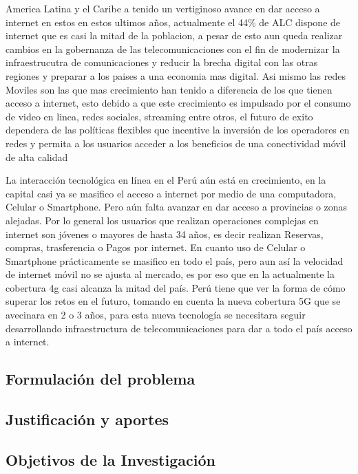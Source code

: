 America Latina y el Caribe a tenido un vertiginoso avance en dar acceso a internet en estos en estos ultimos años, actualmente el 44\% de ALC dispone de internet que es casi la mitad de la poblacion, a pesar de esto aun queda realizar cambios en la gobernanza de las telecomunicaciones con el fin de modernizar la infraestrucutra de comunicaciones y reducir la brecha digital con las otras regiones y preparar a los paises a una economia mas digital. Asi mismo las redes Moviles son las que mas crecimiento han tenido a diferencia de los que tienen acceso a internet, esto debido a que este crecimiento es impulsado por el consumo de video en linea, redes sociales, streaming entre otros, el futuro de exito dependera de las políticas flexibles que incentive la inversión de los operadores en redes y permita a los usuarios acceder a los beneficios de una conectividad móvil de alta calidad

La interacción tecnológica en línea en el Perú aún está en crecimiento, en la capital casi ya se masifico el acceso a internet por medio de una computadora, Celular o Smartphone. Pero aún falta avanzar en dar acceso a provincias o zonas alejadas. Por lo general los usuarios que realizan operaciones complejas en internet son jóvenes o mayores de hasta 34 años, es decir realizan Reservas, compras, trasferencia o Pagos por internet. En cuanto uso de Celular o Smartphone prácticamente se masifico en todo el país, pero aun así la velocidad de internet móvil no se ajusta al mercado, es por eso que en la actualmente la cobertura 4g casi alcanza la mitad del país. Perú tiene que ver la forma de cómo superar los retos en el futuro, tomando en cuenta la nueva cobertura 5G que se avecinara en 2 o 3 años, para esta nueva tecnología se necesitara seguir desarrollando infraestructura de telecomunicaciones para dar a todo el país acceso a internet.

\singlespacing

\subsection{Formulación del problema}


\subsection{Justificación y aportes}


\subsection{Objetivos de la Investigación}

